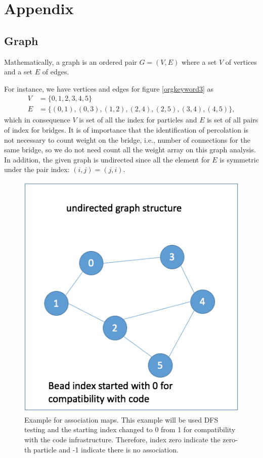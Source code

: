 \documentclass[11pt]{article}
\begin{document}
\section{Appendix}
\label{sec:orgheadline16}
\subsection{Graph}
\label{sec:orgheadline14}
Mathematically, a graph is an ordered pair \(G = (V, E)\) where a set \(V\) of vertices and a set \(E\) of edges. 

For instance, we have vertices and edges for figure \ref{orgkeyword3} as 
\begin{align}
V &= \{0, 1, 2, 3, 4, 5\}\\
E &= \{(0, 1), (0, 3), (1, 2), (2, 4), (2, 5), (3, 4), (4, 5)\},
\end{align}
which in consequence \(V\) is set of all the index for particles and \(E\) is set of all pairs of index for bridges. It is of importance that the identification of percolation is not necessary to count weight on the bridge, i.e., number of connections for the same bridge, so we do not need count all the weight array on this graph analysis. In addition, the given graph is undirected since all the element for \(E\) is symmetric under the pair index: \((i, j) = (j, i)\). 

\begin{figure}[htb]
\centering
\includegraphics[width=.9\linewidth]{data_structure/ex_graph_DFS.png}
\caption{Example for association maps. This example will be used DFS testing and the starting index  changed to 0 from 1 for compatibility with the code infrastructure. Therefore, index zero indicate the zero-th particle and -1 indicate there is no association.}
\end{figure}
\end{document}
